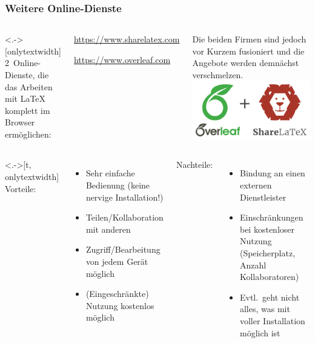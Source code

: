 \begin{frame}[<+->]
	\frametitle{Weitere Online-Dienste}

	\hfuzz=18pt
	\begin{columns}<.->[onlytextwidth]
		2~Online-Dienste, die das Arbeiten mit {\LaTeX} komplett im Browser ermöglichen:
		\begin{description}[<.->]
			\item[ShareLaTeX] \url{https://www.sharelatex.com}
			\item[Overleaf] \url{https://www.overleaf.com}
		\end{description}
		Die beiden Firmen sind jedoch vor Kurzem fusioniert und die Angebote werden demnächst verschmelzen.
		\hspace{-3mm}
		\includegraphics[width=\textwidth]{res/overleaf_plus_sharelatex.png}
	\end{columns}

	\medskip

	\begin{columns}<.->[t, onlytextwidth]
		Vorteile:
		\begin{itemize}
			\item Sehr einfache Bedienung (keine nervige Installation!)
			\item Teilen/Kollaboration mit anderen
			\item Zugriff/Bearbeitung von jedem Gerät möglich
			\item (Eingeschränkte) Nutzung kostenlos möglich
		\end{itemize}
		Nachteile:
		\begin{itemize}
			\item Bindung an einen externen Dienstleister
			\item Einschränkungen bei kostenloser Nutzung (Speicherplatz, Anzahl Kollaboratoren)
			\item Evtl.\ geht nicht alles, was mit voller Installation möglich ist
		\end{itemize}
	\end{columns}
\end{frame}


